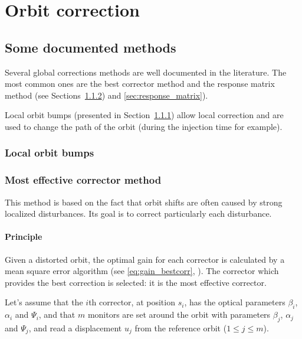 
\chapter{Orbit correction}
\label{sec:correction}
\section{Some documented methods}

Several global corrections methods are well documented in the literature. The most common ones are the best corrector method and the response matrix method (see Sections~\ref{sec:most_effective_corr}) and \ref{sec:response_matrix}). 

Local orbit bumps (presented in Section~\ref{sec:orbit_bump}) allow local correction and are used to change the path of the orbit (during the injection time for example).

\subsection{Local orbit bumps}
\label{sec:orbit_bump}

\subsection{Most effective corrector method}
\label{sec:most_effective_corr}
This method is based on the fact that orbit shifts are often caused by strong localized disturbances. Its goal is to correct particularly each disturbance.

\subsubsection{Principle}

Given a distorted orbit, the optimal gain for each corrector is calculated by a mean square error algorithm (see \eqref{eq:gain_bestcorr}, \cite{book:wille}). The corrector which provides the best correction is selected: it is the most effective corrector.

Let's assume that the $i$th corrector, at position $s_i$, has the optical parameters $\beta_i$, $\alpha_i$ and $\Psi_i$, and that $m$ monitors are set around the orbit with parameters $\beta_j$, $\alpha_j$ and $\Psi_j$, and read a displacement $u_j$ from the reference orbit ($1 \leq j \leq m$).

